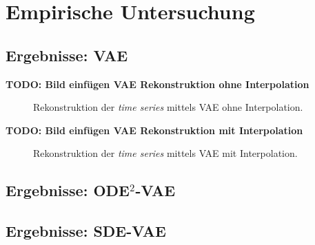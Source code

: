 \documentclass[12pt]{article}
\begin{document}
	\section[Empirische Untersuchung]{Empirische Untersuchung}
	\subsection[VAE]{Ergebnisse: VAE}

	\textbf{TODO: Bild einfügen VAE Rekonstruktion ohne Interpolation}
	\begin{figure}[!htbp]
		\centering
		\caption{Rekonstruktion der \emph{time series} mittels VAE ohne Interpolation.}
	\end{figure}
	\textbf{TODO: Bild einfügen VAE Rekonstruktion mit Interpolation}
	\begin{figure}[!htbp]
		\centering
		\caption{Rekonstruktion der \emph{time series} mittels VAE mit Interpolation.}
	\end{figure}
	\newpage
	\subsection[ODE$^2$-VAE]{Ergebnisse: ODE$^2$-VAE}

	\newpage
	\subsection[SDE-VAE]{Ergebnisse: SDE-VAE}
	\newpage
\end{document}

